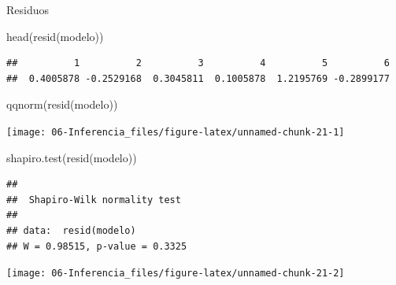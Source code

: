 \documentclass[
]{book}
\newenvironment{Shaded}{\begin{snugshade}}{\end{snugshade}}
\newcommand{\CommentTok}[1]{\textcolor[rgb]{0.56,0.35,0.01}{\textit{#1}}}
\newcommand{\FunctionTok}[1]{\textcolor[rgb]{0.00,0.00,0.00}{#1}}
\newcommand{\NormalTok}[1]{#1}
\newcommand{\SpecialCharTok}[1]{\textcolor[rgb]{0.00,0.00,0.00}{#1}}
\theoremstyle{break}
\theoremstyle{nonumberplain}
\begin{document}
Residuos

\begin{Shaded}
\begin{Highlighting}[]
\FunctionTok{head}\NormalTok{(}\FunctionTok{resid}\NormalTok{(modelo))}
\end{Highlighting}
\end{Shaded}

\begin{verbatim}
##          1          2          3          4          5          6 
##  0.4005878 -0.2529168  0.3045811  0.1005878  1.2195769 -0.2899177
\end{verbatim}

\begin{Shaded}
\begin{Highlighting}[]
\FunctionTok{qqnorm}\NormalTok{(}\FunctionTok{resid}\NormalTok{(modelo))}
\end{Highlighting}
\end{Shaded}

\begin{center}\texttt{[image: 06-Inferencia\_files/figure-latex/unnamed-chunk-21-1]} \end{center}

\begin{Shaded}
\begin{Highlighting}[]
\FunctionTok{shapiro.test}\NormalTok{(}\FunctionTok{resid}\NormalTok{(modelo))}
\end{Highlighting}
\end{Shaded}

\begin{verbatim}
## 
##  Shapiro-Wilk normality test
## 
## data:  resid(modelo)
## W = 0.98515, p-value = 0.3325
\end{verbatim}

\begin{Shaded}
\end{Shaded}

\begin{center}\texttt{[image: 06-Inferencia\_files/figure-latex/unnamed-chunk-21-2]} \end{center}
\end{document}
